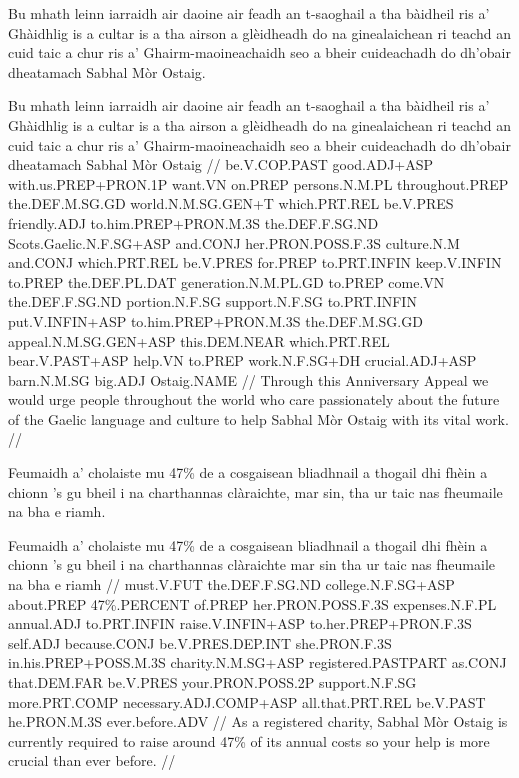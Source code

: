 \documentclass[a4paper,10pt]{article}
\begin{document}
\ex
\begingl
\glpre Bu mhath leinn iarraidh air daoine air feadh an t-saoghail a tha bàidheil ris a' Ghàidhlig is a cultar is a tha airson a glèidheadh do na ginealaichean ri teachd an cuid taic a chur ris a' Ghairm-maoineachaidh seo a bheir cuideachadh do dh'obair dheatamach Sabhal Mòr Ostaig. 

\vspace{4mm}
\gla Bu mhath leinn iarraidh air daoine {air feadh} an t-saoghail a tha bàidheil ris a' Ghàidhlig is a cultar is a tha airson a glèidheadh do na ginealaichean ri teachd an cuid taic a chur ris a' Ghairm-maoineachaidh seo a bheir cuideachadh do dh'obair dheatamach Sabhal Mòr Ostaig  //
\glb be.V.COP.PAST good.ADJ+ASP with.us.PREP+PRON.1P want.VN on.PREP persons.N.M.PL throughout.PREP the.DEF.M.SG.GD world.N.M.SG.GEN+T which.PRT.REL be.V.PRES friendly.ADJ to.him.PREP+PRON.M.3S the.DEF.F.SG.ND Scots.Gaelic.N.F.SG+ASP and.CONJ her.PRON.POSS.F.3S culture.N.M and.CONJ which.PRT.REL be.V.PRES for.PREP to.PRT.INFIN keep.V.INFIN to.PREP the.DEF.PL.DAT generation.N.M.PL.GD to.PREP come.VN the.DEF.F.SG.ND portion.N.F.SG support.N.F.SG to.PRT.INFIN put.V.INFIN+ASP to.him.PREP+PRON.M.3S the.DEF.M.SG.GD appeal.N.M.SG.GEN+ASP this.DEM.NEAR which.PRT.REL bear.V.PAST+ASP help.VN to.PREP work.N.F.SG+DH crucial.ADJ+ASP barn.N.M.SG big.ADJ Ostaig.NAME  //
\glft Through this Anniversary Appeal we would urge people throughout the world who care passionately about the future of the Gaelic language and culture to help Sabhal Mòr Ostaig with its vital work. //
\endgl
\xe

\ex
\begingl
\glpre Feumaidh a' cholaiste mu 47\% de a cosgaisean bliadhnail a thogail dhi fhèin a chionn 's gu bheil i na charthannas clàraichte, mar sin, tha ur taic nas fheumaile na bha e riamh. 

\vspace{4mm}
\gla Feumaidh a' cholaiste mu 47\% de a cosgaisean bliadhnail a thogail dhi fhèin {a chionn 's gu} bheil i na charthannas clàraichte mar sin tha ur taic nas fheumaile na bha e riamh  //
\glb must.V.FUT the.DEF.F.SG.ND college.N.F.SG+ASP about.PREP 47\%.PERCENT of.PREP her.PRON.POSS.F.3S expenses.N.F.PL annual.ADJ to.PRT.INFIN raise.V.INFIN+ASP to.her.PREP+PRON.F.3S self.ADJ because.CONJ be.V.PRES.DEP.INT she.PRON.F.3S in.his.PREP+POSS.M.3S charity.N.M.SG+ASP registered.PASTPART as.CONJ that.DEM.FAR be.V.PRES your.PRON.POSS.2P support.N.F.SG more.PRT.COMP necessary.ADJ.COMP+ASP all.that.PRT.REL be.V.PAST he.PRON.M.3S ever.before.ADV  //
\glft As a registered charity, Sabhal Mòr Ostaig is currently required to raise around 47\% of its annual costs so your help is more crucial than ever before. //
\endgl
\xe
\end{document}
